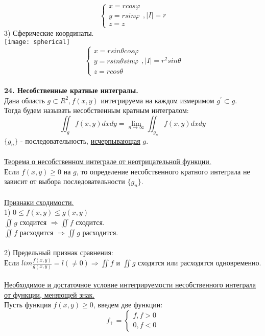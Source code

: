 \documentclass[12pt]{article}
\begin{document}
$$\begin{cases}x=rcos\varphi \\ y=rsin\varphi \\ z=z \end{cases},|I| = r$$
3) Сферические координаты.\\
\texttt{[image: spherical]}\\
$$\begin{cases}x=rsin\theta cos\varphi \\ y=rsin\theta sin\varphi \\ z=rcos\theta \end{cases},|I| = r^2 sin\theta$$
\\
\label{question24_1}\textbf{24. Несобственные кратные интегралы.}\\
Дана область $g \subset R^2, f(x,y)$ интегрируема на каждом измеримом $g^{'} \subset g$.\\
Тогда будем называть несобственным кратным интегралом:\\
$$\iint_g f(x,y) dxdy = \lim_{n\to\infty} \iint_{g_n} f(x,y)dxdy$$
$\{g_n\}$ - последовательность, \hyperref[exhaustSeq]{исчерпывающая} $g$.\\
\\
\label{question24_2}\uline{Теорема о несобственном интеграле от неотрицательной функции.}\\
Если $f(x,y) \geq 0$ на $g$, то определение несобственного кратного интеграла не зависит от выбора последовательности $\{g_n\}$.\\
\\
\label{question24_3}\uline{Признаки сходимости.}\\
1) $0\leq f(x,y) \leq g(x,y)$\\
$\iint g$ сходится $\Rightarrow \iint f$ сходится.\\
$\iint f$ расходится $\Rightarrow \iint g$ расходится.\\
\\
2) Предельный признак сравнения:\\
Если $lim \frac{f(x,y)}{g(x,y)} = l(\neq 0) \Rightarrow \iint f$ и $\iint g$ сходятся или расходятся одновременно.\\
\\
\label{question24_4}\uline{Необходимое и достаточное условие интегрируемости несобственного интеграла от функции, меняющей знак.}\\
Пусть функция $f(x,y) \geq 0$, введем две функции:\\
$$f_{+} = \begin{cases}f, f>0 \\ 0, f<0 \end{cases}$$
\end{document}
